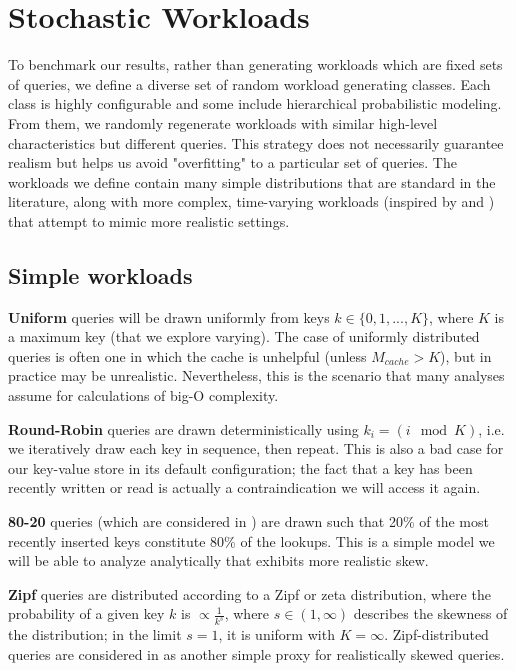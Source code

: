 \documentclass{sig-alternate-05-2015}
\begin{document}
\section{Stochastic Workloads}

To benchmark our results, rather than generating workloads which are fixed sets
of queries, we define a diverse set of random workload generating classes.
Each class is highly configurable and some include hierarchical probabilistic
modeling.  From them, we randomly regenerate workloads with similar high-level
characteristics but different queries. This strategy does not necessarily
guarantee realism but helps us avoid "overfitting" to a particular set of
queries. The workloads we define contain many simple distributions that are
standard in the literature, along with more complex, time-varying workloads
(inspired by \cite{characterizing-memcached} and \cite{linkbench}) that attempt
to mimic more realistic settings.

\subsection{Simple workloads}

\textbf{Uniform} queries will be drawn uniformly from keys $k \in
\{0,1,...,K\}$, where $K$ is a maximum key (that we explore varying).
The case of uniformly distributed queries is often one in
which the cache is unhelpful (unless $M_{cache} > K$), but in practice may be
unrealistic. Nevertheless, this is the scenario that many analyses assume for
calculations of big-O complexity.

\textbf{Round-Robin} queries are drawn deterministically using $k_i = (i \mod
K)$, i.e. we iteratively draw each key in sequence, then repeat.
This is also a bad case for our key-value store in its default configuration;
the fact that a key has been recently written or read is actually a
contraindication we will access it again.

\textbf{80-20} queries (which are considered in \cite{monkey}) are drawn such
that 20\% of the most recently inserted keys constitute 80\% of the lookups.
This is a simple model we will be able to analyze analytically that exhibits
more realistic skew.

\textbf{Zipf} queries are distributed according to a Zipf or zeta distribution,
where the probability of a given key $k$ is $\propto \frac{1}{k^s}$, where $s
\in (1, \infty)$ describes the skewness of the distribution; in the limit
$s=1$, it is uniform with $K=\infty$. Zipf-distributed queries are considered
in \cite{art} as another simple proxy for realistically skewed queries.
\end{document}
